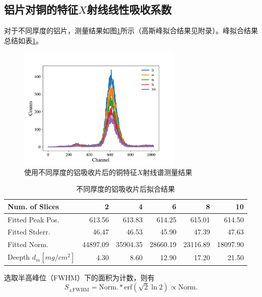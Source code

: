 \documentclass{article}
\begin{document}
    \subsection{铝片对铜的特征$X$射线线性吸收系数}
    对于不同厚度的铝片，测量结果如图\ref{fig:Absorption}所示（高斯峰拟合结果见附录）。峰拟合结果总结如表\ref{tab:Absorption}。
    \begin{figure}[htbp]
        \centering
        \includegraphics[width=0.7\textwidth]{../plot/Absorption.pdf}  
        \caption{使用不同厚度的铝吸收片后的铜特征$X$射线谱测量结果\label{fig:Absorption}}
    \end{figure}
    \begin{table}[htbp]
        \centering
        \caption{不同厚度的铝吸收片后拟合结果\label{tab:Absorption}}
        \begin{tabular}{lrrrrr}
            \toprule
            Num. of Slices &            2 &            4 &            6 &            8 &           10 \\
            \midrule
            Fitted Peak Pos. &    613.56 &    613.83 &    614.25 &    615.01 &    614.50 \\
            Fitted Stderr.   &     46.47 &     46.53 &     45.90 &     47.39 &     47.63 \\
            Fitted Norm.    &  44897.09 &  35904.35 &  28660.19 &  23116.89 &  18097.90 \\
            Deepth $d_m[\si{mg\per cm^2}]$  &      4.30 &      8.60 &     12.90 &     17.20 &     21.50 \\
            \bottomrule
            \end{tabular}
    \end{table} 
    选取半高峰位（FWHM）下的面积为计数，则有
    \begin{equation}
        S_{\pm \text{FWHM}} = \text{Norm.}*\text{erf}{(\sqrt{2}\ln{2})} \propto \text{Norm.} 
    \end{equation}
\end{document}
